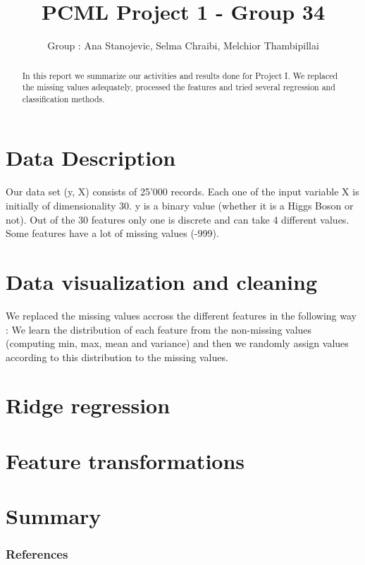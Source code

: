 \documentclass[11pt]{article}
\title{\bf PCML Project 1 - Group 34}
\author{Group \textnumero{34}: Ana Stanojevic, Selma Chraibi, Melchior Thambipillai}
\begin{document}
\maketitle

\begin{abstract}
In this report we summarize our activities and results done for Project I. We replaced the missing values adequately, processed the features and tried several regression and classification methods. 
\end{abstract}

\section{Data Description}
Our data set (y, X) consists of 25'000 records. Each one of the input variable X is initially of dimensionality 30. y is a binary value (whether it is a Higgs Boson or not). Out of the 30 features only one is discrete and can take 4 different values. Some features have a lot of missing values (-999).

\section{Data visualization and cleaning}
We replaced the missing values accross the different features in the following way : We learn the distribution of each feature from the non-missing values (computing min, max, mean and variance) and then we randomly assign values according to this distribution to the missing values.
\section{Ridge regression}

\section{Feature transformations}


\section{Summary}


\subsubsection*{References}
\end{document}
